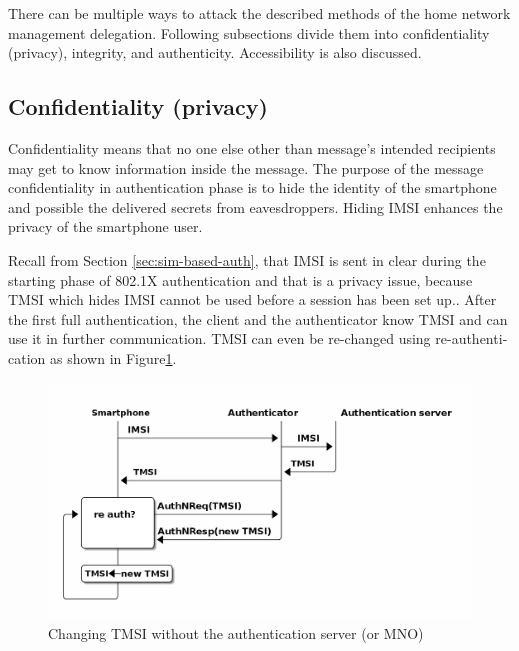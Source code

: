 \documentclass[12pt,a4paper,english]{tutthesis}
\begin{document}
\begin{otherlanguage}{english}
There can be multiple ways to attack the described methods of
the home network management delegation. Following subsections divide them into
confidentiality (privacy), integrity, and
authenticity. Accessibility is also discussed.
\subsection{Confidentiality (privacy)}
\label{sec-6-1-1}

Confidentiality means that no one else other than message's intended
recipients may get to know information inside the message.
The purpose of the message confidentiality in authentication phase is
to hide the identity of the smartphone and possible the delivered
secrets from eavesdroppers. Hiding IMSI enhances the privacy of the smartphone user. 


Recall from Section \ref{sec:sim-based-auth}, that IMSI is sent in clear 
during the starting phase of 802.1X authentication and that is a privacy 
issue, because TMSI which hides IMSI cannot be used before a session
has been set up.\cite[p.66]{rfc4186}.
After the first full authentication, the client and the authenticator 
know TMSI and can use it in further communication. 
TMSI can even be re-changed using re-authentication as shown in Figure\ref{fig:tmsi}.

\begin{figure}[htb]
\centering
\includegraphics[width=.9\linewidth]{imsi-tmsi.png}
\caption{\label{fig:tmsi}Changing TMSI without the authentication server (or MNO)}
\end{figure}





\end{otherlanguage}
\end{document}
